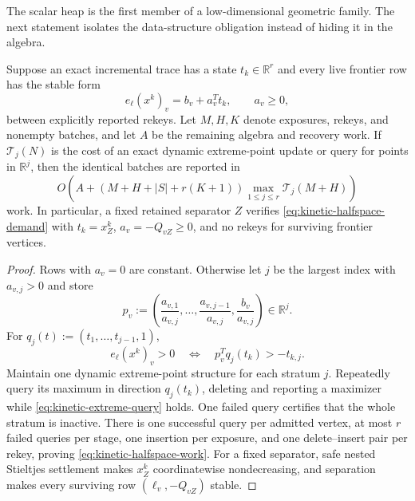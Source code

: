 The scalar heap is the first member of a low-dimensional geometric family.
The next statement isolates the data-structure obligation instead of hiding
it in the algebra.

\begin{theorem}
\label{thm:kinetic-halfspace-gate}
Suppose an exact incremental trace has a state $t_k\in\mathbb R^r$ and every
live frontier row has the stable form
\begin{equation}
 e_\ell(x^k)_v=b_v+a_v^Tt_k,
 \qquad a_v\geq0,
 \label{eq:kinetic-halfspace-demand}
\end{equation}
between explicitly reported rekeys.  Let $M,H,K$ denote exposures, rekeys,
and nonempty batches, and let $A$ be the remaining algebra and recovery work.
If $\mathcal T_j(N)$ is the cost of an exact dynamic extreme-point update or
query for points in $\mathbb R^j$, then the identical batches are reported in
\begin{equation}
 O\!\left(
  A+(M+H+|S|+r(K+1))
  \max_{1\leq j\leq r}\mathcal T_j(M+H)
 \right)
 \label{eq:kinetic-halfspace-work}
\end{equation}
work.  In particular, a fixed retained separator $Z$ verifies
\cref{eq:kinetic-halfspace-demand} with $t_k=x^k_Z$,
$a_v=-Q_{vZ}\geq0$, and no rekeys for surviving frontier vertices.
\end{theorem}

\begin{proof}
Rows with $a_v=0$ are constant.  Otherwise let $j$ be the largest index with
$a_{v,j}>0$ and store
\begin{equation}
 p_v:=\left(
  \frac{a_{v,1}}{a_{v,j}},\ldots,
  \frac{a_{v,j-1}}{a_{v,j}},
  \frac{b_v}{a_{v,j}}
 \right)\in\mathbb R^j.
 \label{eq:kinetic-lifted-point}
\end{equation}
For $q_j(t):=(t_1,\ldots,t_{j-1},1)$,
\begin{equation}
 e_\ell(x^k)_v>0
 \quad\Longleftrightarrow\quad
 p_v^Tq_j(t_k)>-t_{k,j}.
 \label{eq:kinetic-extreme-query}
\end{equation}
Maintain one dynamic extreme-point structure for each stratum $j$.  Repeatedly
query its maximum in direction $q_j(t_k)$, deleting and reporting a maximizer
while \cref{eq:kinetic-extreme-query} holds.  One failed query certifies that
the whole stratum is inactive.  There is one successful query per admitted
vertex, at most $r$ failed queries per stage, one insertion per exposure, and
one delete--insert pair per rekey, proving \cref{eq:kinetic-halfspace-work}.
For a fixed separator, safe nested Stieltjes settlement makes $x^k_Z$
coordinatewise nondecreasing, and separation makes every surviving row
$(\ell_v,-Q_{vZ})$ stable.
\end{proof}

